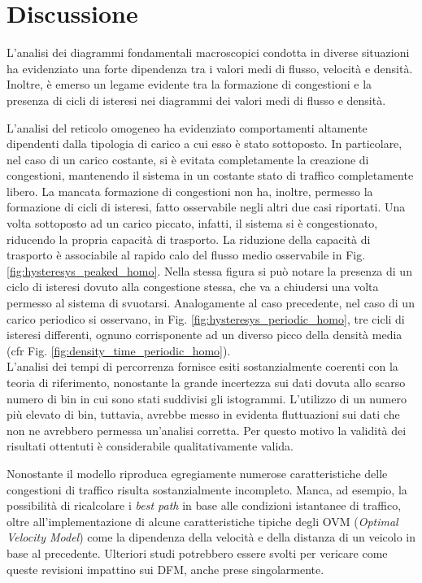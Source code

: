 \documentclass[../main.tex]{subfiles}
\begin{document}
\section{Discussione}
L'analisi dei diagrammi fondamentali macroscopici condotta in diverse situazioni ha evidenziato una forte dipendenza tra i valori medi di flusso, velocit\`a e densit\`a.
Inoltre, \`e emerso un legame evidente tra la formazione di congestioni e la presenza di cicli di isteresi nei diagrammi dei valori medi di flusso e densit\`a.


L'analisi del reticolo omogeneo ha evidenziato comportamenti altamente dipendenti dalla tipologia di carico a cui esso \`e stato sottoposto.
In particolare, nel caso di un carico costante, si \`e evitata completamente la creazione di congestioni, mantenendo il sistema in un costante stato di traffico completamente libero.
La mancata formazione di congestioni non ha, inoltre, permesso la formazione di cicli di isteresi, fatto osservabile negli altri due casi riportati.
Una volta sottoposto ad un carico piccato, infatti, il sistema si \`e congestionato, riducendo la propria capacit\`a di trasporto.
La riduzione della capacit\`a di trasporto \`e associabile al rapido calo del flusso medio osservabile in Fig. \ref{fig:hysteresys_peaked_homo}.
Nella stessa figura si pu\`o notare la presenza di un ciclo di isteresi dovuto alla congestione stessa, che va a chiudersi una volta permesso al sistema di svuotarsi.
Analogamente al caso precedente, nel caso di un carico periodico si osservano, in Fig. \ref{fig:hysteresys_periodic_homo}, tre cicli di isteresi differenti, ognuno corrisponente ad un diverso picco della densit\`a media (cfr Fig. \ref{fig:density_time_periodic_homo}).\\
L'analisi dei tempi di percorrenza fornisce esiti sostanzialmente coerenti con la teoria di riferimento, nonostante la grande incertezza sui dati dovuta allo scarso numero di bin in cui sono stati suddivisi gli istogrammi.
L'utilizzo di un numero pi\`u elevato di bin, tuttavia, avrebbe messo in evidenta fluttuazioni sui dati che non ne avrebbero permessa un'analisi corretta.
Per questo motivo la validit\`a dei risultati ottentuti \`e considerabile qualitativamente valida.


Nonostante il modello riproduca egregiamente numerose caratteristiche delle congestioni di traffico risulta sostanzialmente incompleto.
Manca, ad esempio, la possibilit\`a di ricalcolare i \emph{best path} in base alle condizioni istantanee di traffico, oltre all'implementazione di alcune caratteristiche tipiche degli OVM (\emph{Optimal Velocity Model}) come la dipendenza della velocit\`a e della distanza di un veicolo in base al precedente.
Ulteriori studi potrebbero essere svolti per vericare come queste revisioni impattino sui DFM, anche prese singolarmente.
\end{document}
